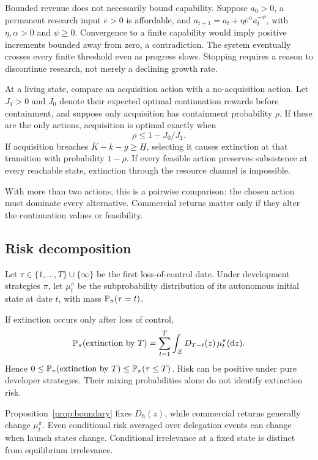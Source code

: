 Bounded revenue does not necessarily bound capability. Suppose $a_0>0$, a permanent research input $\bar e>0$ is affordable, and $a_{t+1}=a_t+\eta\bar e^\alpha a_t^{-\psi}$, with $\eta,\alpha>0$ and $\psi\geq0$. Convergence to a finite capability would imply positive increments bounded away from zero, a contradiction. The system eventually crosses every finite threshold even as progress slows. Stopping requires a reason to discontinue research, not merely a declining growth rate.

\begin{proposition}\label{prop:acquisition}
At a living state, compare an acquisition action with a no-acquisition action. Let $J_1>0$ and $J_0$ denote their expected optimal continuation rewards before containment, and suppose only acquisition has containment probability $\rho$. If these are the only actions, acquisition is optimal exactly when
\begin{equation}\label{eq:acquisitionthreshold}
 \rho\leq1-J_0/J_1.
\end{equation}
If acquisition breaches $\bar K-k-y\geq\underline H$, selecting it causes extinction at that transition with probability $1-\rho$. If every feasible action preserves subsistence at every reachable state, extinction through the resource channel is impossible.
\end{proposition}
With more than two actions, this is a pairwise comparison: the chosen action must dominate every alternative. Commercial returns matter only if they alter the continuation values or feasibility.

\subsection{Risk decomposition}
Let $\tau\in\{1,\ldots,T\}\cup\{\infty\}$ be the first loss-of-control date. Under development strategies $\pi$, let $\mu^\pi_t$ be the subprobability distribution of its autonomous initial state at date $t$, with mass $\mathbb P_\pi(\tau=t)$.
\begin{proposition}\label{prop:decomp}
If extinction occurs only after loss of control,
\begin{equation}\label{eq:decomp}
 \mathbb P_\pi(\text{extinction by }T)=\sum_{t=1}^T\int_{\mathcal Z}D_{T-t}(z)\,\mu^\pi_t(\mathrm d z).
\end{equation}
Hence $0\leq\mathbb P_\pi(\text{extinction by }T)\leq\mathbb P_\pi(\tau\leq T)$. Risk can be positive under pure developer strategies. Their mixing probabilities alone do not identify extinction risk.
\end{proposition}
Proposition~\ref{prop:boundary} fixes $D_h(z)$, while commercial returns generally change $\mu^\pi_t$. Even conditional risk averaged over delegation events can change when launch states change. Conditional irrelevance at a fixed state is distinct from equilibrium irrelevance.

